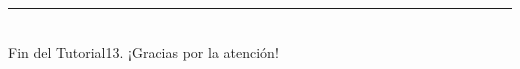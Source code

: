 \documentclass[10pt,a4paper]{article}\usepackage[]{graphicx}\usepackage[]{color}
\newcounter {cont01}
\begin{document}
%


%
%



%





\vspace{2cm} \hrule
\quad\\
Fin del Tutorial13. ¡Gracias por la atención!

\newpage


%
\end{document}
